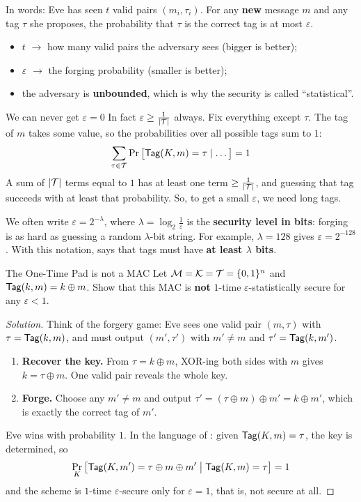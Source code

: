 In words: Eve has seen $t$ valid pairs $(m_i, \tau_i)$. For any \textbf{new} message $m$ and any tag $\tau$ she proposes, the probability that $\tau$ is the correct tag is at most $\varepsilon$.
\begin{itemize}
  \item $t$ $\to$ how many valid pairs the adversary sees (bigger is better);
  \item $\varepsilon$ $\to$ the forging probability (smaller is better);
  \item the adversary is \textbf{unbounded}, which is why the security is called ``statistical''.
\end{itemize}

\begin{framedobs}[label={obs:eps-lower-bound}]{We can never get $\varepsilon = 0$}
  In fact $\varepsilon \geq \frac{1}{|\mathcal{T}|}$ always. Fix everything except $\tau$. The tag of $m$ takes some value, so the probabilities over all possible tags sum to $1$:
  \[
    \sum_{\tau \in \mathcal{T}} \Pr\big[\mathsf{Tag}(K, m) = \tau \mid \ldots\big] = 1
  \]
  A sum of $|\mathcal{T}|$ terms equal to $1$ has at least one term $\geq \frac{1}{|\mathcal{T}|}$, and guessing that tag succeeds with at least that probability. So, to get a small $\varepsilon$, we need long tags.
\end{framedobs}

We often write $\varepsilon = 2^{-\lambda}$, where $\lambda = \log_2 \frac{1}{\varepsilon}$ is the \textbf{security level in bits}: forging is as hard as guessing a random $\lambda$-bit string. For example, $\lambda = 128$ gives $\varepsilon = 2^{-128}$. With this notation,  says that tags must have \textbf{at least $\lambda$ bits}.

\begin{framedprob}[label={prob:otp-mac}]{The One-Time Pad is not a MAC}
  Let $\mathcal{M} = \mathcal{K} = \mathcal{T} = \{0,1\}^n$ and $\mathsf{Tag}(k, m) = k \oplus m$. Show that this MAC is \textbf{not} $1$-time $\varepsilon$-statistically secure for any $\varepsilon < 1$.
\end{framedprob}

\begin{proof}[Solution]
  Think of the forgery game: Eve sees one valid pair $(m, \tau)$ with $\tau = \mathsf{Tag}(k, m)$, and must output $(m', \tau')$ with $m' \neq m$ and $\tau' = \mathsf{Tag}(k, m')$.
  \begin{enumerate}
    \item \textbf{Recover the key.} From $\tau = k \oplus m$, XOR-ing both sides with $m$ gives $k = \tau \oplus m$. One valid pair reveals the whole key.
    \item \textbf{Forge.} Choose any $m' \neq m$ and output $\tau' = (\tau \oplus m) \oplus m' = k \oplus m'$, which is exactly the correct tag of $m'$.
  \end{enumerate}
  Eve wins with probability $1$. In the language of : given $\mathsf{Tag}(K, m) = \tau$, the key is determined, so
  \[
    \Pr_K\big[\mathsf{Tag}(K, m') = \tau \oplus m \oplus m' \;\big|\; \mathsf{Tag}(K, m) = \tau\big] = 1
  \]
  and the scheme is $1$-time $\varepsilon$-secure only for $\varepsilon = 1$, that is, not secure at all.
\end{proof}

